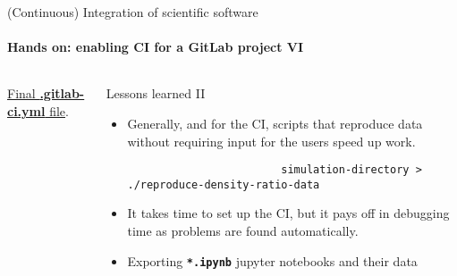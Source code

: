 \begin{frame}[fragile]{(Continuous) Integration of scientific software} 
    \framesubtitle{Hands on: enabling CI for a GitLab project VI} 
    \vfill

    \begin{columns}
        \begin{column}[c]{0.5\textwidth}
    \href{https://gitlab.com/tmaric/minimal-cse-ci-examples/-/blob/01-with-ci/.gitlab-ci.yml}{Final \textbf{.gitlab-ci.yml} file}. 
        \end{column}
        \begin{column}[c]{0.5\textwidth}
            Lessons learned II
            \begin{itemize}
                \item Generally, and for the CI, scripts that reproduce data without requiring input for the users speed up work.
                    \begin{verbatim}
                        simulation-directory > ./reproduce-density-ratio-data
                    \end{verbatim}
                \item It takes time to set up the CI, but it pays off in debugging time as problems are found automatically. 
                \item Exporting \textbf{\texttt{*.ipynb}} jupyter notebooks and their data  
            \end{itemize}
        \end{column}
    \end{columns}

\end{frame}
